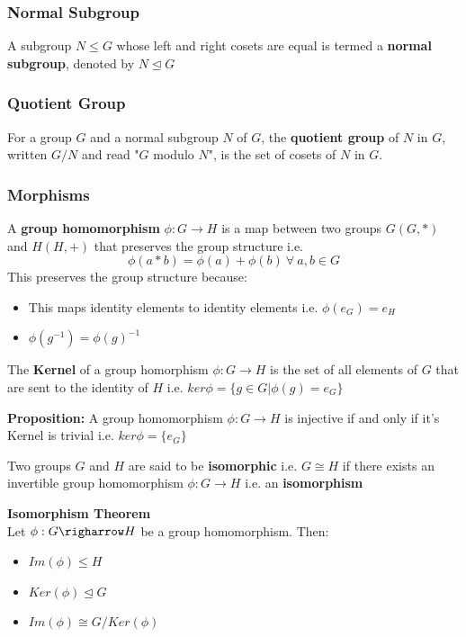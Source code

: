\subsubsection{Normal Subgroup}
A subgroup $N \leq G$ whose left and right cosets are equal is termed a \textbf{normal subgroup}, denoted by $N \trianglelefteq G $
\subsubsection{Quotient Group}
For a group $G$ and a normal subgroup $N$ of $G$, the \textbf{quotient group} of $N$ in $G$, written $G/N$ and read "$G$ modulo $N$", is the set of cosets of $N$ in $G$.

\subsubsection{Morphisms}
A \textbf{group homomorphism} $\phi : G \rightarrow H$ is a map between two groups $G(G, *)$ and $H(H, +)$ that preserves the group structure i.e.
\begin{equation}
    \phi(a * b) = \phi(a) + \phi(b) \ \forall \  a,b \in G
\end{equation}
This preserves the group structure because:
\begin{itemize}
    \item This maps identity elements to identity elements i.e. $\phi(e_G) = e_{H}$
    \item $\phi(g^{-1}) = {\phi(g)}^{-1}$
\end{itemize}
The \textbf{Kernel} of a group homorphism $\phi : G \rightarrow H$ is the set of all elements of $G$ that are sent to the identity of $H$ i.e. $ker\phi = \{ g \in G | \phi(g) = e_{G}\}$
\begin{tcolorbox}
\textbf{Proposition:} A group homomorphism $\phi: G \rightarrow H$ is injective if and only if it's Kernel is trivial i.e. $ker\phi = \{ e_{G} \}$
\end{tcolorbox}
Two groups $G$ and $H$ are said to be \textbf{isomorphic} i.e. $G \cong H$ if there exists an invertible group homomorphism $\phi : G \rightarrow H$ i.e. an \textbf{isomorphism}
\begin{tcolorbox}
    \textbf{Isomorphism Theorem}\\
    Let $\phi: G \righarrow H$ be a group homomorphism. Then:
    \begin{itemize}
        \item $Im(\phi) \leq H$
        \item $Ker(\phi) \trianglelefteq G$
        \item $Im(\phi) \cong G/Ker(\phi)$
    \end{itemize}
\end{tcolorbox}
